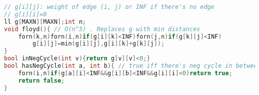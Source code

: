 \begin{lstlisting}[language=C++]
// g[i][j]: weight of edge (i, j) or INF if there's no edge
// g[i][i]=0
ll g[MAXN][MAXN];int n;
void floyd(){ // O(n^3) . Replaces g with min distances
	forn(k,n)forn(i,n)if(g[i][k]<INF)forn(j,n)if(g[k][j]<INF)
		g[i][j]=min(g[i][j],g[i][k]+g[k][j]);
}
bool inNegCycle(int v){return g[v][v]<0;}
bool hasNegCycle(int a, int b){ // true iff there's neg cycle in between
	forn(i,n)if(g[a][i]<INF&&g[i][b]<INF&&g[i][i]<0)return true;
	return false;
}
\end{lstlisting}